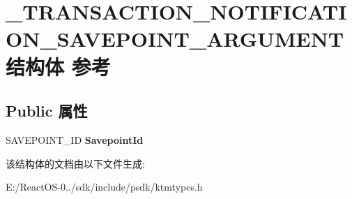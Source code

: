 \hypertarget{struct___t_r_a_n_s_a_c_t_i_o_n___n_o_t_i_f_i_c_a_t_i_o_n___s_a_v_e_p_o_i_n_t___a_r_g_u_m_e_n_t}{}\section{\+\_\+\+T\+R\+A\+N\+S\+A\+C\+T\+I\+O\+N\+\_\+\+N\+O\+T\+I\+F\+I\+C\+A\+T\+I\+O\+N\+\_\+\+S\+A\+V\+E\+P\+O\+I\+N\+T\+\_\+\+A\+R\+G\+U\+M\+E\+N\+T结构体 参考}
\label{struct___t_r_a_n_s_a_c_t_i_o_n___n_o_t_i_f_i_c_a_t_i_o_n___s_a_v_e_p_o_i_n_t___a_r_g_u_m_e_n_t}
\subsection*{Public 属性}
\begin{DoxyCompactItemize}
\item 
\mbox{\label{struct___t_r_a_n_s_a_c_t_i_o_n___n_o_t_i_f_i_c_a_t_i_o_n___s_a_v_e_p_o_i_n_t___a_r_g_u_m_e_n_t_a1998bb4027849b7efdb9b68c96989256}} 
S\+A\+V\+E\+P\+O\+I\+N\+T\+\_\+\+ID {\bfseries Savepoint\+Id}
\end{DoxyCompactItemize}


该结构体的文档由以下文件生成\+:\begin{DoxyCompactItemize}
\item 
E\+:/\+React\+O\+S-\/0../sdk/include/psdk/ktmtypes.\+h\end{DoxyCompactItemize}
